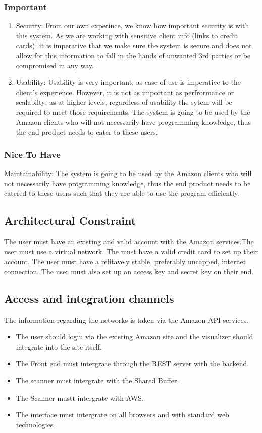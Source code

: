 \documentclass[hidelinks,a4paper,12pt]{article}
\begin{document}
\subsubsection {Important}
\begin{enumerate}  
	\item Security: From our own experince, we know how important security is with this system. As we are working with sensitive client info (links to credit cards), it is imperative that we make sure the system is secure and does not allow for this information to fall in the hands of unwanted 3rd parties or be compromised in any way.
	
	\item Usability: Usability is very important, as ease of use is imperative to the client's experience. However, it is not as important as perfrormance or scalabilty; as at higher levels, regardless of usability the sytem will be required to meet those requirements. The system is going to be used by the Amazon clients who will not necessarily have programming knowledge, thus the end product needs to cater to these users.
\end{enumerate}	

\subsubsection {Nice To Have}
Maintainability: The system is going to be used by the Amazon clients who will not necessarily have programming knowledge, thus the end product needs to be catered to these users such that they are able to use the program efficiently.
\subsection{Architectural Constraint}
The user must have an existing and valid account with the Amazon services.The user must use a virtual network. The must have a valid credit card to set up their account. The user must have a relitavely stable, preferably uncapped, internet connection. The user must also set up an access key and secret key on their end.
\subsection{Access and integration channels}
The information regarding the networks is taken via the Amazon API services.
\begin{itemize}  
	\item The user should login via the existing Amazon site and the visualizer should integrate into the site itself.
	\item The Front end must intergrate through the REST server with the backend.
	\item The scanner must intergrate with the Shared Buffer.
	\item The Scanner mustt intergrate with AWS.
	\item The interface must intergrate on all browsers and with standard web technologies
\end{itemize}
\end{document}
